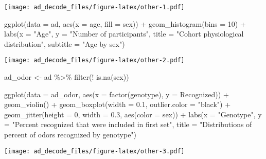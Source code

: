 \documentclass[
]{article}
\newenvironment{Shaded}{\begin{snugshade}}{\end{snugshade}}
\newcommand{\AttributeTok}[1]{\textcolor[rgb]{0.77,0.63,0.00}{#1}}
\newcommand{\DecValTok}[1]{\textcolor[rgb]{0.00,0.00,0.81}{#1}}
\newcommand{\FloatTok}[1]{\textcolor[rgb]{0.00,0.00,0.81}{#1}}
\newcommand{\FunctionTok}[1]{\textcolor[rgb]{0.00,0.00,0.00}{#1}}
\newcommand{\NormalTok}[1]{#1}
\newcommand{\OtherTok}[1]{\textcolor[rgb]{0.56,0.35,0.01}{#1}}
\newcommand{\SpecialCharTok}[1]{\textcolor[rgb]{0.00,0.00,0.00}{#1}}
\newcommand{\StringTok}[1]{\textcolor[rgb]{0.31,0.60,0.02}{#1}}
\begin{document}
\texttt{[image: ad\_decode\_files/figure-latex/other-1.pdf]}

\begin{Shaded}
\begin{Highlighting}[]
\FunctionTok{ggplot}\NormalTok{(}\AttributeTok{data =}\NormalTok{ ad, }\FunctionTok{aes}\NormalTok{(}\AttributeTok{x =}\NormalTok{ age, }\AttributeTok{fill =}\NormalTok{ sex)) }\SpecialCharTok{+}
  \FunctionTok{geom\_histogram}\NormalTok{(}\AttributeTok{bins =} \DecValTok{10}\NormalTok{) }\SpecialCharTok{+}
  \FunctionTok{labs}\NormalTok{(}\AttributeTok{x =} \StringTok{"Age"}\NormalTok{,}
    \AttributeTok{y =} \StringTok{"Number of participants"}\NormalTok{,}
    \AttributeTok{title =} \StringTok{"Cohort physiological distribution"}\NormalTok{,}
    \AttributeTok{subtitle =} \StringTok{"Age by sex"}\NormalTok{)}
\end{Highlighting}
\end{Shaded}

\texttt{[image: ad\_decode\_files/figure-latex/other-2.pdf]}

\begin{Shaded}
\begin{Highlighting}[]
\NormalTok{ad\_odor }\OtherTok{\textless{}{-}}\NormalTok{ ad }\SpecialCharTok{\%\textgreater{}\%} 
  \FunctionTok{filter}\NormalTok{(}\SpecialCharTok{!} \FunctionTok{is.na}\NormalTok{(sex))}

\FunctionTok{ggplot}\NormalTok{(}\AttributeTok{data =}\NormalTok{ ad\_odor, }\FunctionTok{aes}\NormalTok{(}\AttributeTok{x =} \FunctionTok{factor}\NormalTok{(genotype), }\AttributeTok{y =}\NormalTok{ Recognized)) }\SpecialCharTok{+}
  \FunctionTok{geom\_violin}\NormalTok{() }\SpecialCharTok{+}
  \FunctionTok{geom\_boxplot}\NormalTok{(}\AttributeTok{width =} \FloatTok{0.1}\NormalTok{, }\AttributeTok{outlier.color =} \StringTok{"black"}\NormalTok{) }\SpecialCharTok{+}
  \FunctionTok{geom\_jitter}\NormalTok{(}\AttributeTok{height =} \DecValTok{0}\NormalTok{, }\AttributeTok{width =} \FloatTok{0.3}\NormalTok{, }\FunctionTok{aes}\NormalTok{(}\AttributeTok{color =}\NormalTok{ sex)) }\SpecialCharTok{+}
  \FunctionTok{labs}\NormalTok{(}\AttributeTok{x =} \StringTok{"Genotype"}\NormalTok{,}
    \AttributeTok{y =} \StringTok{"Percent recognized that were included in first set"}\NormalTok{,}
    \AttributeTok{title =} \StringTok{"Distributions of percent of odors recognized by genotype"}\NormalTok{)}
\end{Highlighting}
\end{Shaded}

\texttt{[image: ad\_decode\_files/figure-latex/other-3.pdf]}
\end{document}
